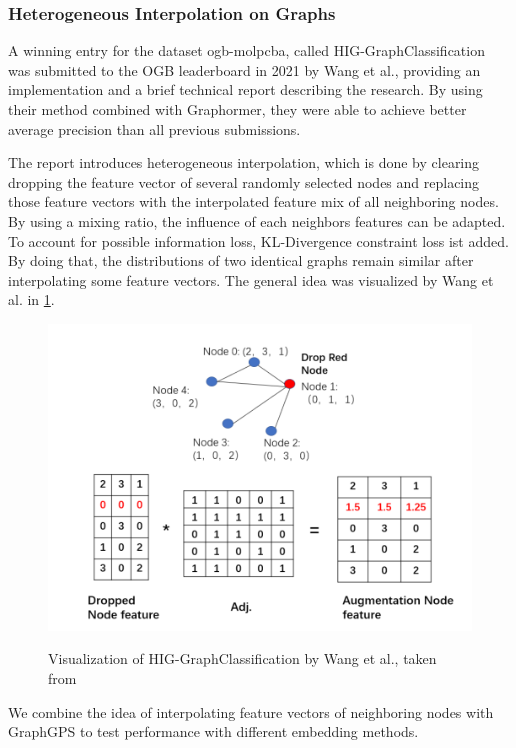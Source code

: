\subsubsection{Heterogeneous Interpolation on Graphs}
A winning entry for the dataset ogb-molpcba, called HIG-GraphClassification~\cite{tencenc2021Hig,tencenc2021HigPaper} was submitted to the OGB leaderboard in 2021 by Wang et al., providing an implementation and a brief technical report describing the research. By using their method combined with Graphormer, they were able to achieve better average precision than all previous submissions. 

The report introduces heterogeneous interpolation, which is done by clearing dropping the feature vector of several randomly selected nodes and replacing those feature vectors with the interpolated feature mix of all neighboring nodes.
By using a mixing ratio, the influence of each neighbors features can be adapted. To account for possible information loss, KL-Divergence constraint loss ist added. By doing that, the distributions of two identical graphs remain similar after interpolating some feature vectors. The general idea was visualized by Wang et al. in \ref*{hig_figure}.

\begin{figure}[h!]
    \centering
    \includegraphics[scale=0.3]{tex/res/hig_figure.png}
    \label{hig_figure}
    \caption{Visualization of HIG-GraphClassification by Wang et al., taken from~\cite{tencenc2021HigPaper}}
\end{figure}

We combine the idea of interpolating feature vectors of neighboring nodes with GraphGPS to test performance with different embedding methods. 